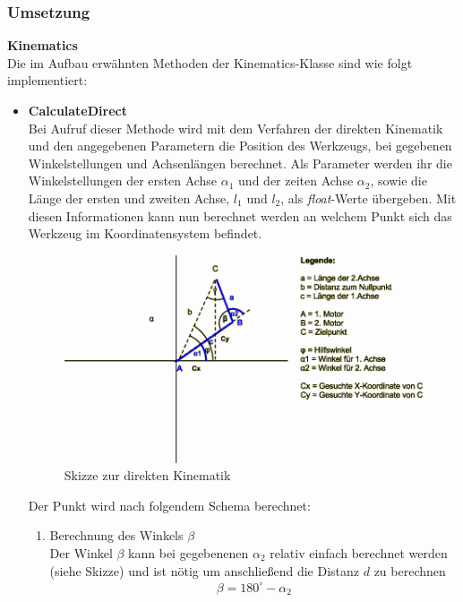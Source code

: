 \subsubsection{Umsetzung}
\textbf{Kinematics}\\
Die im Aufbau erwähnten Methoden der Kinematics-Klasse sind wie folgt implementiert:
\begin{itemize}
\item \textbf{CalculateDirect}\\
Bei Aufruf dieser Methode wird mit dem Verfahren der direkten Kinematik und den angegebenen Parametern die Position des Werkzeugs, bei gegebenen Winkelstellungen und Achsenlängen berechnet. Als Parameter werden ihr die Winkelstellungen der ersten Achse $\alpha_1$ und der zeiten Achse $\alpha_2$, sowie die Länge der ersten und zweiten Achse, $l_1$ und $l_2$, als \textit{float}-Werte übergeben. Mit diesen Informationen kann nun berechnet werden an welchem Punkt sich das Werkzeug im Koordinatensystem befindet.\\
\begin{figure}[H]
  \centering
  \begin{minipage}[t]{12 cm}
  	\centering
  	\includegraphics[width=12cm]{images/Direktkinematik} 
    \caption{Skizze zur direkten Kinematik}
  \end{minipage}
\end{figure}
Der Punkt wird nach folgendem Schema berechnet:
\begin{enumerate}
\item Berechnung des Winkels $\beta$\\
Der Winkel $\beta$ kann bei gegebenenen $\alpha_2$ relativ einfach berechnet werden (siehe Skizze) und ist nötig um anschließend die Distanz $d$ zu berechnen\\
\begin{align*}
\beta = 180^\circ - \alpha_2

\end{align*}
\end{enumerate}
\end{itemize}
